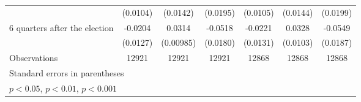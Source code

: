 \begin{table}[!ht]
\begin{tabular}{l*{6}{c}}
                    &    (0.0104)         &    (0.0142)         &    (0.0195)         &    (0.0105)         &    (0.0144)         &    (0.0199)         \\
[1em]
 6 quarters after the election&     -0.0204         &      0.0314\sym{**} &     -0.0518\sym{**} &     -0.0221         &      0.0328\sym{**} &     -0.0549\sym{**} \\
                    &    (0.0127)         &   (0.00985)         &    (0.0180)         &    (0.0131)         &    (0.0103)         &    (0.0187)         \\
\hline
Observations        &       12921         &       12921         &       12921         &       12868         &       12868         &       12868         \\
\hline\hline
\multicolumn{7}{l}{\footnotesize Standard errors in parentheses}\\
\multicolumn{7}{l}{\footnotesize \sym{*} \(p<0.05\), \sym{**} \(p<0.01\), \sym{***} \(p<0.001\)}\\
\end{tabular}
\end{table}
